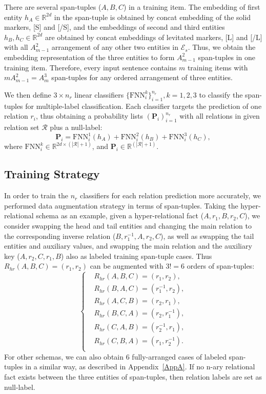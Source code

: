 \documentclass{article} \usepackage{iclr2024_conference,times}
\begin{document}
There are several span-tuples ($A,B,C$) in a training item. The embedding of first entity $h_{A}\in\mathbb{R}^{2d}$ in the span-tuple is obtained by concat embedding of the solid markers, [S] and [/S], and the embeddings of second and third entities $h_{B}, h_{C}\in\mathbb{R}^{2d}$ are obtained by concat embeddings of levitated markers, [L] and [/L] with all $A_{m-1}^2$ arrangement of any other two entities in $\mathcal{E}_s$. Thus, we obtain the embedding representation of the three entities to form $A_{m-1}^2$ span-tuples in one training item. Therefore, every input sentence contains $m$ training items with $mA_{m-1}^2=A_{m}^3$ span-tuples for any ordered arrangement of three entities.

We then define $3 \times n_r$ linear classifiers $\{\text{FNN}^k_i\}_{i=1}^{n_r}, k=1,2,3$ to classify the span-tuples for multiple-label classification. Each classifier targets the prediction of one relation $r_i$, thus obtaining a probability lists $(\mathbf{P}_i)_{i=1}^{n_r}$ with all relations in given relation set $\mathcal{R}$ plus a null-label:
\begin{equation}
\mathbf{P}_i=\text{FNN}^1_i(h_{A})+\text{FNN}^2_i(h_{B})+\text{FNN}^3_i(h_{C}),
\end{equation}
where $\text{FNN}^k_i\in\mathbb{R}^{2d\times (|\mathcal{R}|+1)}$, and $\mathbf{P}_i\in \mathbb{R}^{(|\mathcal{R}|+1)}$. 




\subsection{Training Strategy}
In order to train the $n_r$ classifiers for each relation prediction more accurately, we performed data augmentation strategy in terms of span-tuples. Taking the hyper-relational schema as an example, given a hyper-relational fact ($A,r_1,B,r_2,C$), we consider swapping the head and tail entities and changing the main relation to the corresponding inverse relation ($B,r_1^{-1},A,r_2,C$), as well as swapping the tail entities and auxiliary values, and swapping the main relation and the auxiliary key ($A,r_2,C,r _1,B$) also as labeled training span-tuple cases. Thus $R_{hr}(A,B,C)=(r_1,r_2)$ can be augmented with $3!=6$ orders of span-tuples:
\begin{equation}
\left\{
\begin{aligned}
&R_{hr}(A,B,C)=(r_1,r_2),\\
&R_{hr}(B,A,C)=(r_1^{-1},r_2),\\
&R_{hr}(A,C,B)=(r_2,r_1),\\
&R_{hr}(B,C,A)=(r_2,r_1^{-1}),\\
&R_{hr}(C,A,B)=(r_2^{-1},r_1),\\
&R_{hr}(C,B,A)=(r_1,r_2^{-1}).\\
\end{aligned}
\right.
\label{e9}
\end{equation}
For other schemas, we can also obtain 6 fully-arranged cases of labeled span-tuples in a similar way, as described in Appendix~\ref{AppA}. If no n-ary relational fact exists between the three entities of span-tuples, then relation labels are set as null-label.
\end{document}
